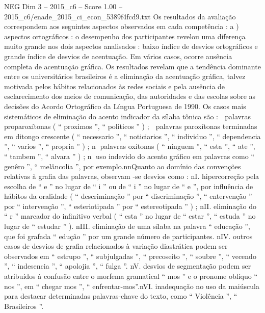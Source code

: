 \begin{textsample}{NEG Dim 3 – 2015\_c6 – Score 1.00 – 2015\_c6/enade\_2015\_ci\_econ\_5389f4fcd9.txt}
Os resultados da avaliação correspondem aos seguintes aspectos observados em cada competência : a ) aspectos ortográficos : o desempenho dos participantes revelou uma diferença muito grande nos dois aspectos analisados : baixo índice de desvios ortográficos e grande índice de desvios de acentuação.
Em vários casos, ocorre ausência completa de acentuação gráfica.
Os resultados revelam que a tendência dominante entre os universitários brasileiros é a eliminação da acentuação gráfica, talvez motivada pelos hábitos relacionados às redes sociais e pela ausência de esclarecimento dos meios de comunicação, das autoridades e das escolas sobre as decisões do Acordo Ortográfico da Língua Portuguesa de 1990.
Os casos mais sistemáticos de eliminação do acento indicador da sílaba tônica são :  palavras proparoxítonas ( “ proximos ”, “ politicos ” ) ;  palavras paroxítonas terminadas em ditongo crescente ( “ necessario ”, “ noticiarios ”, “ individuo ”, “ dependencia ”, “ varios ”, “ propria ” ) ; n palavras oxítonas ( “ ninguem ”, “ esta ”, “ ate ”, “ tambem ”, “ alvara ” ) ; n uso indevido do acento gráfico em palavras como “ genêro ”, “ melâncolia ”, por exemplo.nnQuanto ao domínio das convenções relativas à grafia das palavras, observam -se desvios como : nI. hipercorreção pela escolha de “ e ” no lugar de “ i ” ou de “ i ” no lugar de “ e ”, por influência de hábitos da oralidade ( “ descriminação ” por “ discriminação ”, “ entervenção ” por “ intervenção ”, “ esteriotipada ” por “ estereotipada ” ) ; nII. eliminação do “ r ” marcador do infinitivo verbal ( “ esta ” no lugar de “ estar ”, “ estuda ” no lugar de “ estudar ” ). nIII. eliminação de uma sílaba na palavra “ educação ”, que foi grafada “ edução ” por um grande número de participantes. nIV. outros casos de desvios de grafia relacionados à variação diastrática podem ser observados em “ estrupo ”, “ subjulgadas ”, “ precoseito ”, “ soubre ”, “ vecendo ”, “ indesencia ”, “ apolojia ”, “ fulga ”. nV. desvios de segmentação podem ser atribuídos à confusão entre o morfema gramatical “ mos ” e o pronome oblíquo “ nos ”, em “ chegar mos ”, “ enfrentar-mos”.nVI. inadequação no uso da maiúscula para destacar determinadas palavras-chave do texto, como “ Violência ”, “ Brasileiros ”.

\end{textsample}
